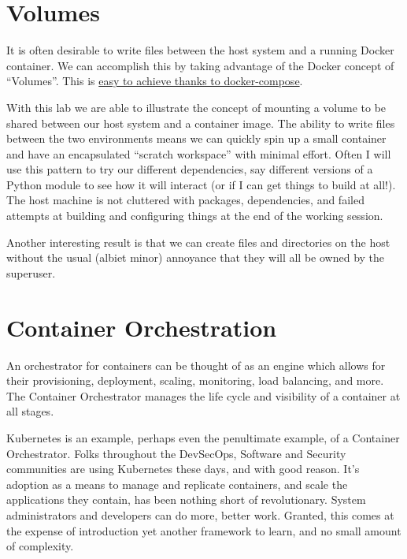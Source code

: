 \section{Volumes}

It is often desirable to write files between the host system and a running Docker container. We can accomplish this by taking advantage of the Docker concept of ``Volumes''. This is \href{https://docs.docker.com/storage/volumes/#use-a-volume-with-docker-compose}{easy to achieve thanks to docker-compose}.


\justifying
With this lab we are able to illustrate the concept of mounting a volume to be shared between our host system and a 
container image. The ability to write files between the two environments means we can quickly spin up a small container and have an
encapsulated ``scratch workspace'' with minimal effort. Often I will use this pattern to try our different dependencies, say
different versions of a Python module to see how it will interact (or if I can get things to build at all!). The host machine is
not cluttered with packages, dependencies, and failed attempts at building and configuring things at the end of the working
session.

\justifying
Another interesting result is that we can create files and directories on the host without the usual (albiet minor) annoyance
that they will all be owned by the superuser. 

\section{Container Orchestration}

\justify{}
An orchestrator for containers can be thought of as an engine which allows for their provisioning, deployment, scaling, monitoring, load
balancing, and more. The Container Orchestrator manages the life cycle and visibility of a container at all stages.

\justify{}
Kubernetes is an example, perhaps even the penultimate example, of a Container Orchestrator.
Folks throughout the DevSecOps, Software and Security communities are using Kubernetes these days, and
with good reason. It's adoption as a means to manage and replicate containers, and scale the applications they contain,
has been nothing short of revolutionary. System administrators and developers can do more, better work. Granted, this comes at
the expense of introduction yet another framework to learn, and no small amount of complexity.

